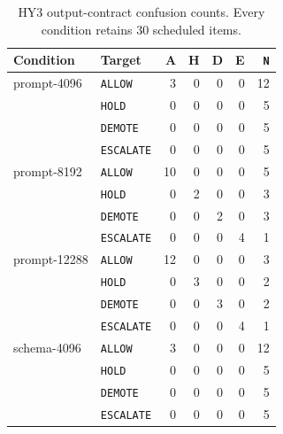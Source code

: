 \documentclass[10pt]{article}
\newcommand{\allow}{\texttt{ALLOW}}
\newcommand{\hold}{\texttt{HOLD}}
\newcommand{\demote}{\texttt{DEMOTE}}
\newcommand{\escalate}{\texttt{ESCALATE}}
\begin{document}
\begin{table}[htbp]
\centering
\footnotesize
\setlength{\tabcolsep}{3pt}
\caption{HY3 output-contract confusion counts. Every condition retains 30 scheduled items.}
\label{tab:output-hy3-confusion}
\begin{tabular}{@{}llrrrrr@{}}
\toprule
Condition & Target & A & H & D & E & \texttt{N} \\
\midrule
prompt-4096 & \allow{} & 3&0&0&0&12 \\
 & \hold{} & 0&0&0&0&5 \\
 & \demote{} & 0&0&0&0&5 \\
 & \escalate{} & 0&0&0&0&5 \\
\midrule
prompt-8192 & \allow{} & 10&0&0&0&5 \\
 & \hold{} & 0&2&0&0&3 \\
 & \demote{} & 0&0&2&0&3 \\
 & \escalate{} & 0&0&0&4&1 \\
\midrule
prompt-12288 & \allow{} & 12&0&0&0&3 \\
 & \hold{} & 0&3&0&0&2 \\
 & \demote{} & 0&0&3&0&2 \\
 & \escalate{} & 0&0&0&4&1 \\
\midrule
schema-4096 & \allow{} & 3&0&0&0&12 \\
 & \hold{} & 0&0&0&0&5 \\
 & \demote{} & 0&0&0&0&5 \\
 & \escalate{} & 0&0&0&0&5 \\
\bottomrule
\end{tabular}
\end{table}
\end{document}
